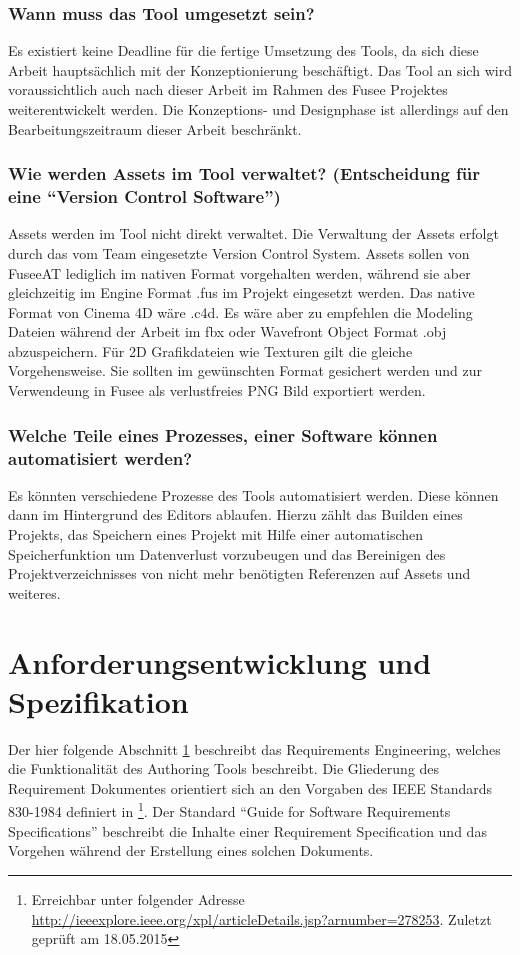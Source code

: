 \documentclass[pagesize, paper=a4, fontsize=12pt, titlepage=true, headings=small, headnosepline, abstractoff, liststotoc, nochapterprefix, plainheadsepline, twoside]{scrreprt}
\begin{document}
\subsubsection{Wann muss das Tool umgesetzt sein?}
Es existiert keine Deadline für die fertige Umsetzung des Tools, da sich diese Arbeit hauptsächlich mit der Konzeptionierung beschäftigt. Das Tool an sich wird voraussichtlich auch nach dieser Arbeit im Rahmen des Fusee Projektes weiterentwickelt werden. Die Konzeptions- und Designphase ist allerdings auf den Bearbeitungszeitraum dieser Arbeit beschränkt.

\subsubsection{Wie werden Assets im Tool verwaltet? (Entscheidung für eine “Version Control Software”)}
Assets werden im Tool nicht direkt verwaltet. Die Verwaltung der Assets erfolgt durch das vom Team eingesetzte Version Control System. Assets sollen von FuseeAT lediglich im nativen Format vorgehalten werden, während sie aber gleichzeitig im Engine Format .fus im Projekt eingesetzt werden. Das native Format von Cinema 4D wäre .c4d. Es wäre aber zu empfehlen die Modeling Dateien während der Arbeit im fbx oder Wavefront Object Format .obj abzuspeichern. Für 2D Grafikdateien wie Texturen gilt die gleiche Vorgehensweise. Sie sollten im gewünschten Format gesichert werden und zur Verwendeung in Fusee als verlustfreies PNG Bild exportiert werden.

\subsubsection{Welche Teile eines Prozesses, einer Software können automatisiert werden?}
Es könnten verschiedene Prozesse des Tools automatisiert werden. Diese können dann im Hintergrund des Editors ablaufen. Hierzu zählt das Builden eines Projekts, das Speichern eines Projekt mit Hilfe einer automatischen Speicherfunktion um Datenverlust vorzubeugen und das Bereinigen des Projektverzeichnisses von nicht mehr benötigten Referenzen auf Assets und weiteres.

\section{Anforderungsentwicklung und Spezifikation}\label{sec:RAD}
Der hier folgende Abschnitt \ref{sec:RAD} beschreibt das Requirements Engineering, welches die Funktionalität des Authoring Tools beschreibt. Die Gliederung des Requirement Dokumentes orientiert sich an den Vorgaben des IEEE Standards 830-1984 definiert in \footnote{Erreichbar unter folgender Adresse \url{http://ieeexplore.ieee.org/xpl/articleDetails.jsp?arnumber=278253}. Zuletzt geprüft am 18.05.2015}. Der Standard “Guide for Software Requirements Specifications” beschreibt die Inhalte einer Requirement Specification und das Vorgehen während der Erstellung eines solchen Dokuments.
\end{document}
